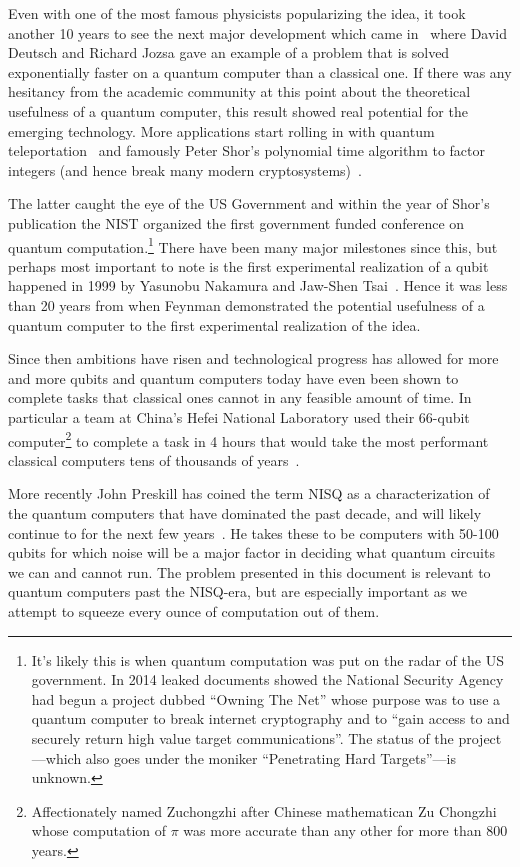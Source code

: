Even with one of the most famous physicists popularizing the idea, it took another 10 years to see the next major development which came in~\cite{deutch-jozsa-algo} where David Deutsch and Richard Jozsa gave an example of a problem that is solved exponentially faster on a quantum computer than a classical one.
If there was any hesitancy from the academic community at this point about the theoretical usefulness of a quantum computer, this result showed real potential for the emerging technology.
More applications start rolling in with quantum teleportation~\cite{quantumteleportation} and famously Peter Shor's polynomial time algorithm to factor integers (and hence break many modern cryptosystems)~\cite{shor-encryption}.

The latter caught the eye of the US Government and within the year of Shor's publication the \ac{NIST} organized the first government funded conference on quantum computation.\footnote{It's likely this is when quantum computation was put on the radar of the US government. In 2014 leaked documents showed the National Security Agency had begun a project dubbed ``Owning The Net'' whose purpose was to use a quantum computer to break internet cryptography and to ``gain access to and securely return high value target communications''. The status of the project---which also goes under the moniker ``Penetrating Hard Targets''---is unknown.}
There have been many major milestones since this, but perhaps most important to note is the first experimental realization of a qubit happened in 1999 by Yasunobu Nakamura and Jaw-Shen Tsai~\cite{firstqubit}.
Hence it was less than 20 years from when Feynman demonstrated the potential usefulness of a quantum computer to the first experimental realization of the idea.

Since then ambitions have risen and technological progress has allowed for more and more qubits and quantum computers today have even been shown to complete tasks that classical ones cannot in any feasible amount of time.
In particular a team at China's Hefei National Laboratory used their 66-qubit computer\footnote{Affectionately named Zuchongzhi after Chinese mathematican Zu Chongzhi whose computation of $\pi$ was more accurate than any other for more than 800 years.} to complete a task in 4 hours that would take the most performant classical computers tens of thousands of years~\cite{zuchongzhi}.

More recently John Preskill has coined the term \ac{NISQ} as a characterization of the quantum computers that have dominated the past decade, and will likely continue to for the next few years~\cite{nisq}.
He takes these to be computers with 50-100 qubits for which noise will be a major factor in deciding what quantum circuits we can and cannot run.
The problem presented in this document is relevant to quantum computers past the \ac{NISQ}-era, but are especially important as we attempt to squeeze every ounce of computation out of them.


